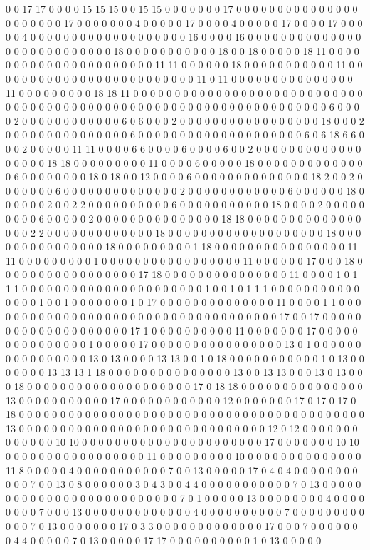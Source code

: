 0 0 17 17 0 0 0 0 15 15 15 0 0 15 15 0 0 0 0 0 0 0 17 0 0 0 0 0 0 0 0 0 0 0 0 0 0 0 0 0 0 0 0 0 0 17 0 0 0 0 0 0 0 4 0 0 0 0 0 17 0 0 0 0 4 0 0 0 0 0 17 0 0 0 0 17 0 0 0 0 0 4 0 0 0 0 0 0 0 0 0 0 0 0 0 0 0 0 0 0 0 16 0 0 0 0 16 0 0 0 0 0 0 0 0 0 0 0 0 0 0 0 0 0 0 0 0 0 0 0 0 0 0 0 18 0 0 0 0 0 0 0 0 0 0 0 18 0 0 18 0 0 0 0 0 18 11 0 0 0 0 0 0 0 0 0 0 0 0 0 0 0 0 0 0 0 0 0 0 11 11 0 0 0 0 0 0 18 0 0 0 0 0 0 0 0 0 0 0 11 0 0 0 0 0 0 0 0 0 0 0 0 0 0 0 0 0 0 0 0 0 0 0 0 0 11 0 11 0 0 0 0 0 0 0 0 0 0 0 0 0 0 0 11 0 0 0 0 0 0 0 0 0 18 18 11 0 0 0 0 0 0 0 0 0 0 0 0 0 0 0 0 0 0 0 0 0 0 0 0 0 0 0 0 0 0 0 0 0 0 0 0 0 0 0 0 0 0 0 0 0 0 0 0 0 0 0 0 0 0 0 0 0 0 0 0 0 0 0 0 0 0 0 6 0 0 0 0 2 0 0 0 0 0 0 0 0 0 0 0 0 6 0 6 0 0 0 2 0 0 0 0 0 0 0 0 0 0 0 0 0 0 0 0 0 18 0 0 0 2 0 0 0 0 0 0 0 0 0 0 0 0 0 0 0 6 0 0 0 0 0 0 0 0 0 0 0 0 0 0 0 0 0 0 0 0 6 0 6 18 6 6 0 0 0 2 0 0 0 0 0 11 11 0 0 0 0 6 6 0 0 0 0 6 0 0 0 0 6 0 0 2 0 0 0 0 0 0 0 0 0 0 0 0 0 0 0 0 0 0 18 18 0 0 0 0 0 0 0 0 0 11 0 0 0 0 6 0 0 0 0 0 18 0 0 0 0 0 0 0 0 0 0 0 0 0 0 6 0 0 0 0 0 0 0 0 18 0 18 0 0 12 0 0 0 0 6 0 0 0 0 0 0 0 0 0 0 0 0 0 0 18 2 0 0 2 0 0 0 0 0 0 0 6 0 0 0 0 0 0 0 0 0 0 0 0 0 0 2 0 0 0 0 0 0 0 0 0 0 0 0 6 0 0 0 0 0 0 18 0 0 0 0 0 0 2 0 0 2 2 0 0 0 0 0 0 0 0 0 0 6 0 0 0 0 0 0 0 0 0 0 0 18 0 0 0 0 2 0 0 0 0 0 0 0 0 0 6 0 0 0 0 0 2 0 0 0 0 0 0 0 0 0 0 0 0 0 0 0 18 18 0 0 0 0 0 0 0 0 0 0 0 0 0 0 0 0 0 2 2 0 0 0 0 0 0 0 0 0 0 0 0 0 18 0 0 0 0 0 0 0 0 0 0 0 0 0 0 0 0 0 0 0 18 0 0 0 0 0 0 0 0 0 0 0 0 0 0 0 18 0 0 0 0 0 0 0 0 0 1 18 0 0 0 0 0 0 0 0 0 0 0 0 0 0 0 0 11 11 0 0 0 0 0 0 0 0 0 1 0 0 0 0 0 0 0 0 0 0 0 0 0 0 0 0 0 11 0 0 0 0 0 0 17 0 0 0 18 0 0 0 0 0 0 0 0 0 0 0 0 0 0 0 0 0 17 18 0 0 0 0 0 0 0 0 0 0 0 0 0 0 0 11 0 0 0 0 1 0 1 1 1 0 0 0 0 0 0 0 0 0 0 0 0 0 0 0 0 0 0 0 0 0 0 1 0 0 1 0 1 1 1 0 0 0 0 0 0 0 0 0 0 0 0 0 0 0 1 0 0 1 0 0 0 0 0 0 0 1 0 17 0 0 0 0 0 0 0 0 0 0 0 0 0 0 11 0 0 0 0 1 1 0 0 0 0 0 0 0 0 0 0 0 0 0 0 0 0 0 0 0 0 0 0 0 0 0 0 0 0 0 0 0 0 0 0 0 0 17 0 0 17 0 0 0 0 0 0 0 0 0 0 0 0 0 0 0 0 0 0 0 0 17 1 0 0 0 0 0 0 0 0 0 0 11 0 0 0 0 0 0 0 17 0 0 0 0 0 0 0 0 0 0 0 0 0 0 0 1 0 0 0 0 0 17 0 0 0 0 0 0 0 0 0 0 0 0 0 0 0 0 13 0 1 0 0 0 0 0 0 0 0 0 0 0 0 0 0 0 0 13 0 13 0 0 0 0 13 13 0 0 1 0 18 0 0 0 0 0 0 0 0 0 0 0 1 0 13 0 0 0 0 0 0 0 13 13 13 1 18 0 0 0 0 0 0 0 0 0 0 0 0 0 0 0 13 0 0 13 13 0 0 0 13 0 13 0 0 0 18 0 0 0 0 0 0 0 0 0 0 0 0 0 0 0 0 0 0 0 0 17 0 18 18 0 0 0 0 0 0 0 0 0 0 0 0 0 0 0 13 0 0 0 0 0 0 0 0 0 0 0 17 0 0 0 0 0 0 0 0 0 0 0 0 12 0 0 0 0 0 0 0 17 0 17 0 17 0 18 0 0 0 0 0 0 0 0 0 0 0 0 0 0 0 0 0 0 0 0 0 0 0 0 0 0 0 0 0 0 0 0 0 0 0 0 0 0 0 0 0 0 13 0 0 0 0 0 0 0 0 0 0 0 0 0 0 0 0 0 0 0 0 0 0 0 0 0 0 0 0 0 0 12 0 12 0 0 0 0 0 0 0 0 0 0 0 0 0 10 10 0 0 0 0 0 0 0 0 0 0 0 0 0 0 0 0 0 0 0 0 0 0 17 0 0 0 0 0 0 0 10 10 0 0 0 0 0 0 0 0 0 0 0 0 0 0 0 0 0 11 0 0 0 0 0 0 0 0 0 10 0 0 0 0 0 0 0 0 0 0 0 0 0 0 11 8 0 0 0 0 0 4 0 0 0 0 0 0 0 0 0 0 0 7 0 0 13 0 0 0 0 0 17 0 4 0 4 0 0 0 0 0 0 0 0 0 0 0 7 0 0 13 0 8 0 0 0 0 0 0 3 0 4 3 0 0 4 4 0 0 0 0 0 0 0 0 0 0 0 7 0 13 0 0 0 0 0 0 0 0 0 0 0 0 0 0 0 0 0 0 0 0 0 0 0 0 0 0 7 0 1 0 0 0 0 0 13 0 0 0 0 0 0 0 0 4 0 0 0 0 0 0 0 0 7 0 0 0 13 0 0 0 0 0 0 0 0 0 0 0 0 0 4 0 0 0 0 0 0 0 0 0 0 7 0 0 0 0 0 0 0 0 0 0 0 0 7 0 13 0 0 0 0 0 0 0 17 0 3 3 0 0 0 0 0 0 0 0 0 0 0 0 0 17 0 0 0 7 0 0 0 0 0 0 0 4 4 0 0 0 0 0 7 0 13 0 0 0 0 0 17 17 0 0 0 0 0 0 0 0 0 0 1 0 13 0 0 0 0 0 